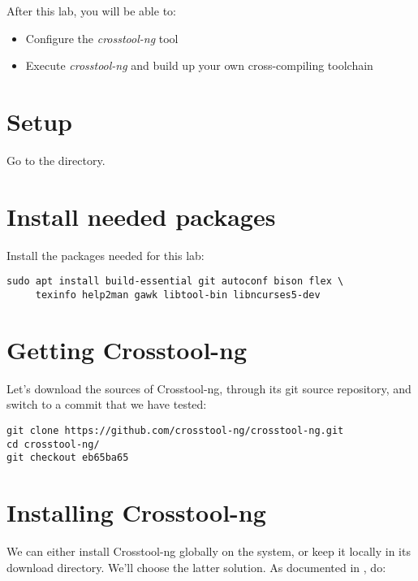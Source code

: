 
After this lab, you will be able to:

\begin{itemize}
\item Configure the {\em crosstool-ng} tool
\item Execute {\em crosstool-ng} and build up your own cross-compiling toolchain
\end{itemize}

\section{Setup}

Go to the  directory.

\section{Install needed packages}

Install the packages needed for this lab:

\begin{verbatim}
sudo apt install build-essential git autoconf bison flex \
     texinfo help2man gawk libtool-bin libncurses5-dev
\end{verbatim}

\section{Getting Crosstool-ng}

Let's download the sources of Crosstool-ng, through its git
source repository, and switch to a commit that we have tested: 

\begin{verbatim}
git clone https://github.com/crosstool-ng/crosstool-ng.git
cd crosstool-ng/
git checkout eb65ba65 
\end{verbatim}

\section{Installing Crosstool-ng}

We can either install Crosstool-ng globally on the system, or keep it
locally in its download directory. We'll choose the latter
solution. As documented in
, do:

